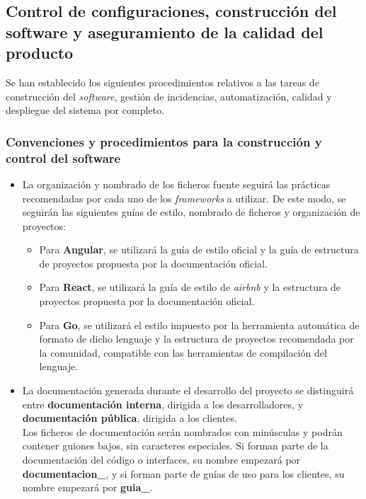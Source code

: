 \documentclass[11pt, a4paper, titlepage]{article}
\begin{document}
\subsection{Control de configuraciones, construcción del software y aseguramiento de la calidad del producto}

Se han establecido los siguientes procedimientos relativos a las tareas de construcción del \textit{software}, gestión de incidencias, automatización, calidad y despliegue del sistema por completo.

\subsubsection{Convenciones y procedimientos para la construcción y control del software}

\begin{itemize}
    \item La organización y nombrado de los ficheros fuente seguirá las prácticas recomendadas por cada uno de los \textit{frameworks} a utilizar. De este modo, se seguirán las siguientes guías de estilo, nombrado de ficheros y organización de proyectos:
    \begin{itemize}
        \item Para \textbf{Angular}, se utilizará la guía de estilo oficial\cite{estiloangular} y la guía de estructura de proyectos propuesta por la documentación oficial\cite{estructuraangular}.
        
        \item Para \textbf{React}, se utilizará la
        guía de estilo de \textit{airbnb}\cite{estiloreact} y la estructura de proyectos propuesta por la documentación oficial\cite{estructurareact}.
        
        \item Para \textbf{Go}, se utilizará el estilo impuesto por la herramienta automática de formato de dicho lenguaje\cite{estilogolang} y la estructura de proyectos recomendada por la comunidad\cite{estructuragolang}, compatible con las herramientas de compilación del lenguaje.
    \end{itemize}
    
    \item La documentación generada durante el desarrollo del proyecto se distinguirá entre \textbf{documentación interna}, dirigida a los desarrolladores, y \textbf{documentación pública}, dirigida a los clientes.\\
    
    Los ficheros de documentación serán nombrados con minúsculas y podrán contener guiones bajos, sin caracteres especiales. Si forman parte de la documentación del código o interfaces, su nombre empezará por \textbf{documentacion\_}, y si forman parte de guías de uso para los clientes, su nombre empezará por \textbf{guia\_}.
    

\end{itemize}
\end{document}
